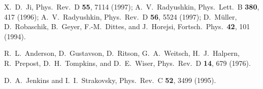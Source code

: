 \documentclass[aps,prc,twocolumn,floatfix,showpacs,preprintnumbers,amsmath,amssymb,superscriptaddress,linenumbers]{revtex4-1}
\begin{document}
\begin{thebibliography}{99}
  X.~D.~Ji,
  Phys.\ Rev.\ D {\bf 55}, 7114 (1997);
  A.~V.~Radyushkin,
  Phys.\ Lett.\ B {\bf 380}, 417 (1996);
  A.~V.~Radyushkin,
  Phys.\ Rev.\ D {\bf 56}, 5524 (1997);
  D.~M\"uller, D.~Robaschik, B.~Geyer, F.-M.~Dittes, and J.~Horejsi,
  Fortsch.\ Phys.\  {\bf 42}, 101 (1994).


  R.~L.~Anderson, D.~Gustavson, D.~Ritson, G.~A.~Weitsch, H.~J.~Halpern, R.~Prepost, D.~H.~Tompkins, and D.~E.~Wiser,
  Phys.\ Rev.\ D {\bf 14}, 679 (1976).

  D.~A.~Jenkins and I.~I.~Strakovsky,
  Phys.\ Rev.\ C {\bf 52}, 3499 (1995).


\end{thebibliography}
\end{document}
